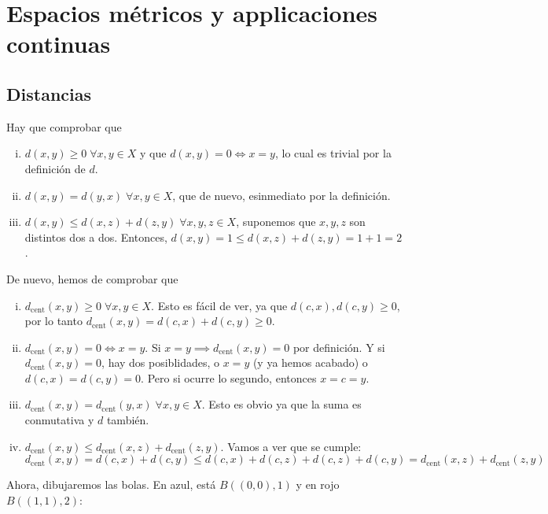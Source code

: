 \chapter{Espacios m\'etricos y applicaciones continuas}
\section{Distancias}

\begin{ej}
	Hay que comprobar que
	\begin{enumerate}[i)]
		\item $ d(x,y) \geq 0 \; \forall x,y \in X $ y que $ d(x,y) = 0 \iff x = y $, lo cual es trivial por la definición de $ d $.
		\item $ d(x,y) = d(y,x) \; \forall x, y \in X $, que de nuevo, esinmediato por la definición.
		\item $ d(x,y) \leq d(x,z) + d(z,y) \; \forall x, y, z \in X $, suponemos que $ x, y, z $ son distintos dos a dos. Entonces,
			$ d(x,y) = 1 \leq d(x, z) + d(z, y) = 1 + 1 = 2 $.
	\end{enumerate}
\end{ej}

\begin{ej}
	De nuevo, hemos de comprobar que
	\begin{enumerate}[i)]
		\item $d_{\text{cent}}(x, y) \geq 0 \; \forall x, y \in X$. Esto es fácil de ver, ya que $d(c, x), d(c,y) \geq 0$, por lo tanto
			$d_{\text{cent}}(x,y) = d(c,x) + d(c,y) \geq 0$.
		\item $d_{\text{cent}}(x, y) = 0 \iff x = y$. Si $x = y \implies d_{\text{cent}}(x,y) = 0$ por definición. Y si $d_{\text{cent}}(x,y) = 0$,
			hay dos posiblidades, o $x = y$ (y ya hemos acabado) o $d(c, x) = d(c,y) = 0$. Pero si ocurre lo segundo, entonces $x = c = y$.
		\item $d_{\text{cent}}(x, y) = d_{\text{cent}}(y, x) \; \forall x, y \in X$. Esto es obvio ya que la suma es conmutativa y $d$ tambi\'en.
		\item $d_{\text{cent}}(x,y) \leq d_{\text{cent}}(x, z) + d_{\text{cent}}(z, y)$. Vamos a ver que se cumple:
			\[
				d_{\text{cent}}(x, y) = d(c,x) + d(c,y) \leq d(c,x) + d(c,z) + d(c,z) + d(c,y) =
				d_{\text{cent}}(x, z) + d_{\text{cent}}(z,y)
			\]
	\end{enumerate}
	Ahora, dibujaremos las bolas. En azul, está $B\left( (0,0), 1 \right)$ y en rojo $B\left( (1,1), 2 \right)$:
	\begin{center}
		
	\end{center}
\end{ej}

